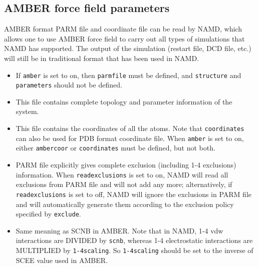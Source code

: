 \subsection{AMBER force field parameters}

AMBER format PARM file and coordinate file can be read by NAMD,
which allows one to use AMBER force field to carry out all types
of simulations that NAMD has supported. The output of
the simulation (restart file, DCD file, etc.) will still be in
traditional format that has been used in NAMD.

\begin{itemize}

\item
{}
{
If {\tt amber} is set to on, then {\tt parmfile} must be defined,
and {\tt structure} and {\tt parameters} should not be defined.
}

\item
{}
{
This file contains complete topology and parameter information of
the system.
}

\item
{}
{
This file contains the coordinates of all the atoms. Note that
{\tt coordinates} can also be used for PDB format coordinate
file. When {\tt amber} is set to on, either {\tt ambercoor}
or {\tt coordinates} must be defined, but not both.
}

\item
{}
{
PARM file explicitly gives complete exclusion (including 1-4
exclusions) information. When {\tt readexclusions} is set to on,
NAMD will read all exclusions from PARM file and will not add any
more; alternatively, if {\tt readexclusions} is set to
off, NAMD will ignore the exclusions in PARM file and will
automatically generate them according to the
exclusion policy specified by {\tt exclude}.
}

\item
{}
{
Same meaning as SCNB in AMBER. Note that in NAMD, 1-4 vdw
interactions are DIVIDED by {\tt scnb}, whereas 1-4 electrostatic
interactions are MULTIPLIED by {\tt 1-4scaling}. So
{\tt 1-4scaling} should be set to the inverse of SCEE value used
in AMBER.
}

\end{itemize}

